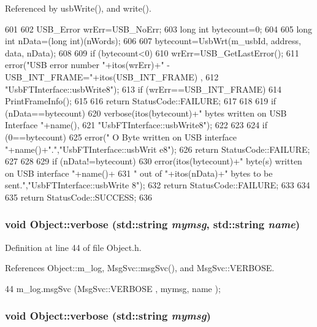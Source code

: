 Referenced by usbWrite(), and write().


\begin{DoxyCode}
601                                                              {
602   USB_Error wrErr=USB_NoErr;
603   long int  bytecount=0;
604 
605   long int nData=(long int)(nWords);
606 
607   bytecount=UsbWrt(m_usbId, address, data, nData);
608 
609   if (bytecount<0){
610     wrErr=USB_GetLastError();
611     error("USB error number "+itos(wrErr)+" - USB_INT_FRAME="+itos(USB_INT_FRAME)
      ,
612             "UsbFTInterface::usbWrite8");
613     if (wrErr==USB_INT_FRAME){
614       PrintFrameInfo();
615     } 
616     return StatusCode::FAILURE;
617   }
618 
619   if (nData==bytecount){
620     verbose(itos(bytecount)+" bytes written on USB Interface "+name(),
621             "UsbFTInterface::usbWrite8");
622   }
623   
624   if (0==bytecount){
625     error(" O Byte written on USB interface "+name()+".","UsbFTInterface::usbWrit
      e8");
626     return StatusCode::FAILURE;
627   }
628 
629   if (nData!=bytecount){
630     error(itos(bytecount)+" byte(s) written on USB interface "+name()+
631             " out of "+itos(nData)+" bytes to be sent.","UsbFTInterface::usbWrite
      8");
632     return StatusCode::FAILURE;    
633   }
634 
635   return StatusCode::SUCCESS;  
636 }
\end{DoxyCode}
\hypertarget{classObject_a2d4120195317e2a3c6532e8bb9f3da68}{
\subsubsection[{verbose}]{\setlength{\rightskip}{0pt plus 5cm}void Object::verbose (std::string {\em mymsg}, \/  std::string {\em name})}}
\label{classObject_a2d4120195317e2a3c6532e8bb9f3da68}


Definition at line 44 of file Object.h.

References Object::m\_\-log, MsgSvc::msgSvc(), and MsgSvc::VERBOSE.


\begin{DoxyCode}
44 { m_log.msgSvc (MsgSvc::VERBOSE , mymsg, name ); }
\end{DoxyCode}
\hypertarget{classObject_a83d2db2df682907ea1115ad721c1c4a1}{
\subsubsection[{verbose}]{\setlength{\rightskip}{0pt plus 5cm}void Object::verbose (std::string {\em mymsg})}}
\label{classObject_a83d2db2df682907ea1115ad721c1c4a1}


